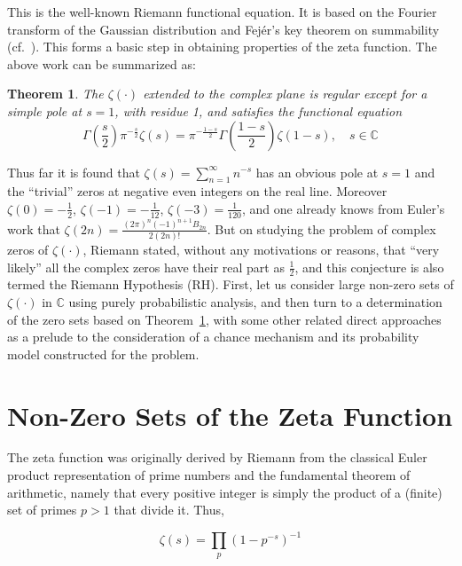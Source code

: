 \documentclass[11pt]{article}
\newtheorem{theorem}{Theorem}
\begin{document}
This is the well-known Riemann functional equation. It is based on the Fourier transform of the Gaussian distribution and Fejér's key theorem on summability (cf.~\cite{zygmund}). This forms a basic step in obtaining properties of the zeta function. The above work can be summarized as:

\begin{theorem}
\label{thm:functional}
The $\zeta(\cdot)$ extended to the complex plane is regular except for a simple pole at $s = 1$, with residue 1, and satisfies the functional equation
\begin{equation}
\label{eq:riemann_functional}
\Gamma\left(\frac{s}{2}\right) \pi^{-\frac{s}{2}} \zeta(s) = \pi^{-\frac{1-s}{2}} \Gamma\left(\frac{1-s}{2}\right) \zeta(1-s), \quad s \in \mathbb{C}
\end{equation}
\end{theorem}

Thus far it is found that $\zeta(s) = \sum_{n=1}^\infty n^{-s}$ has an obvious pole at $s = 1$ and the ``trivial'' zeros at negative even integers on the real line. Moreover $\zeta(0) = -\frac{1}{2}$, $\zeta(-1) = -\frac{1}{12}$, $\zeta(-3) = \frac{1}{120}$, and one already knows from Euler's work that $\zeta(2n) = \frac{(2\pi)^n (-1)^{n+1} B_{2n}}{2(2n)!}$. But on studying the problem of complex zeros of $\zeta(\cdot)$, Riemann stated, without any motivations or reasons, that ``very likely'' all the complex zeros have their real part as $\frac{1}{2}$, and this conjecture is also termed the Riemann Hypothesis (RH). First, let us consider large non-zero sets of $\zeta(\cdot)$ in $\mathbb{C}$ using purely probabilistic analysis, and then turn to a determination of the zero sets based on Theorem~\ref{thm:functional}, with some other related direct approaches as a prelude to the consideration of a chance mechanism and its probability model constructed for the problem.

\section{Non-Zero Sets of the Zeta Function}
\label{sec:nonzero}

The zeta function was originally derived by Riemann from the classical Euler product representation of prime numbers and the fundamental theorem of arithmetic, namely that every positive integer is simply the product of a (finite) set of primes $p > 1$ that divide it. Thus,

\begin{equation}
\label{eq:euler_product}
\zeta(s) = \prod_p (1 - p^{-s})^{-1}
\end{equation}
\end{document}
